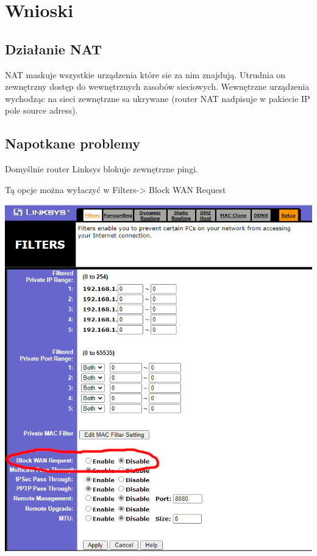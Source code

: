 \documentclass[11pt]{article}
\begin{document}
\section{Wnioski}
\label{sec:orgb11093f}
\subsection{Działanie NAT}
\label{sec:org9169d66}
NAT maskuje wszystkie urządzenia które sie za nim znajdują. Utrudnia on zewnętrzny dostęp do wewnętrznych zasobów sieciowych.
Wewnętrzne urządzenia wychodząc na sieci zewnętrzne sa ukrywane (router NAT nadpisuje w pakiecie IP pole source adress).
\subsection{Napotkane problemy}
\label{sec:org5d77367}
Domyślnie router Linksys blokuje zewnętrzne pingi.

Tą opcje można wyłaczyć w Filters-> Block WAN Request
\begin{center}
\includegraphics[width=.9\linewidth]{./K3/wylaczenie_opcji_na_routerze_block_wan.png}
\end{center}
\end{document}
